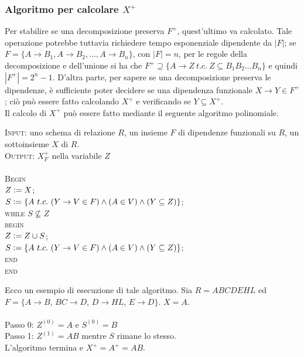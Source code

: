 \subsubsection{Algoritmo per calcolare $X^+$}
Per stabilire se una decomposizione preserva $F^+$, quest'ultimo va calcolato. Tale operazione potrebbe 
tuttavia richiedere tempo esponenziale dipendente da $|F|$; se $F = \{A \rightarrow B_1, A \rightarrow B_2,
\ldots, A \rightarrow B_n\}$, con $|F|=n$, per le regole della decomposizione e dell'unione si ha che 
$F^+ \supseteq \{A \rightarrow Z\ t.c.\ Z \subseteq B_1B_2\ldots B_n\}$ e quindi $|F^+| = 2^n-1$. D'altra parte,
per sapere se una decomposizione preserva le dipendenze, è sufficiente poter decidere se una dipendenza 
funzionale $X \rightarrow Y \in F^+$; ciò può essere fatto calcolando $X^+$ e verificando se $Y \subseteq 
X^+$.\\ 
Il calcolo di $X^+$ può essere fatto mediante il seguente algoritmo polinomiale.
\begin{alg}
\textsc{Input:} uno schema di relazione $R$, un insieme $F$ di dipendenze funzionali su $R$, un sottoinsieme
$X$ di $R$.\\
\textsc{Output:} $X^+_F$ nella variabile $Z$\\\\
\textsc{Begin}\\
$Z\vcentcolon= X$;\\
$S\vcentcolon= \{A\ t.c.\ (Y \rightarrow V \in F) \wedge (A \in V) \wedge (Y \subseteq Z)\}$;\\
\textsc{while} $S \not \subseteq Z$\\
\indent \textsc{begin}\\
\indent $Z\vcentcolon = Z \cup S$;\\
\indent $S\vcentcolon= \{A\ t.c.\ (Y \rightarrow V \in F) \wedge (A \in V) \wedge (Y \subseteq Z)\}$;\\
\indent \textsc{end}\\
\textsc{end}\\
\end{alg}
\begin{exmp}
 Ecco un esempio di esecuzione di tale algoritmo. Sia $R = ABCDEHL$ ed $F=\{A\rightarrow B$, $BC\rightarrow D$,
 $D\rightarrow HL$, $E\rightarrow D\}$. $X=A$.\\\\
 Passo 0: $Z^{(0)}=A$ e $S^{(0)}=B$ \\
 Passo 1: $Z^{(1)}=AB$ mentre $S$ rimane lo stesso.\\
 L'algoritmo termina e $X^+=A^+=AB$.
\end{exmp}

